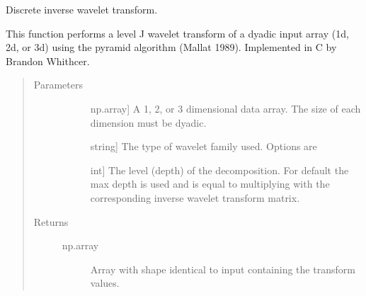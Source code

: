 \documentclass[letterpaper,10pt,english]{sphinxmanual}
\begin{document}
\begin{fulllineitems}
\label{\detokenize{pysmme:pysmme.transforms.iwt}}
\sphinxAtStartPar
Discrete inverse wavelet transform.

\sphinxAtStartPar
This function performs a level J wavelet transform of a dyadic input array (1d, 2d, or 3d) 
using the pyramid algorithm (Mallat 1989). Implemented in C by Brandon Whithcer.
\begin{quote}\begin{description}
\item[{Parameters}] \leavevmode\begin{description}
\item[{}] \leavevmode{[}np.array{]}
\sphinxAtStartPar
A 1, 2, or 3 dimensional data array. The size of each dimension must be dyadic.

\item[{}] \leavevmode{[}string{]}
\sphinxAtStartPar
The type of wavelet family used. Options are 

\item[{}] \leavevmode{[}int{]}
\sphinxAtStartPar
The level (depth) of the decomposition. For default  the max
depth is used and   is equal to multiplying  with the
corresponding inverse wavelet transform matrix.

\end{description}

\item[{Returns}] \leavevmode\begin{description}
\item[{np.array}] \leavevmode
\sphinxAtStartPar
Array with shape identical to input  containing the transform values.

\end{description}

\end{description}\end{quote}

\end{fulllineitems}
\end{document}
